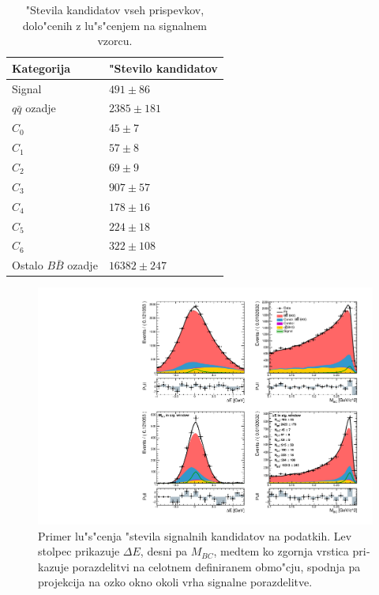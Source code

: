 \begin{otherlanguage}{slovene}
\begin{table}[H]
	\centering
	\begin{tabular}{l|l}
		Kategorija & "Stevilo kandidatov \\
		\toprule
		Signal & $491 \pm 86$ \\
		$q \bar q$ ozadje & $ 2385 \pm 181 $ \\
		$C_0$ & $ 45 \pm 7 $ \\
		$C_1$ & $ 57 \pm 8 $\\
		$C_2$ & $ 69 \pm 9 $ \\
		$C_3$ & $ 907 \pm 57 $ \\
		$C_4$ & $ 178 \pm 16 $ \\
		$C_5$ & $ 224 \pm 18 $ \\
		$C_6$ & $ 322 \pm 108 $ \\
		Ostalo $B \bar B$ ozadje & $ 16382 \pm 247 $ \\
		\bottomrule
	\end{tabular}
	\captionsetup{width=.8\linewidth}
	\caption{"Stevila kandidatov vseh prispevkov, dolo"cenih z lu"s"cenjem na signalnem vzorcu.}
	\label{tab:sig_yields_si}
\end{table}

\begin{figure}[H]
	\centering
	\captionsetup{width=0.8\linewidth}
	\includegraphics[width=\linewidth]{fig/sig_fit_data}
	\caption{Primer lu"s"cenja "stevila signalnih kandidatov na podatkih. Lev stolpec prikazuje $\Delta E$, desni pa $M_{BC}$, medtem ko zgornja vrstica prikazuje porazdelitvi na celotnem definiranem obmo"cju, spodnja pa projekcija na ozko okno okoli vrha signalne porazdelitve.}
	\label{fig:sig_datafit_si}
\end{figure}


\end{otherlanguage}
